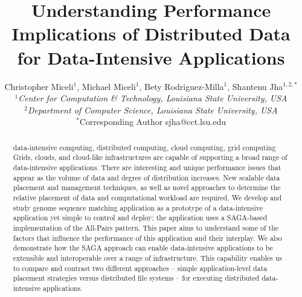\documentclass{rspublic}
\title[Understanding Performance Implications of Distributed Data for
Data-Intensive Applications]{Understanding Performance Implications of
Distributed Data for Data-Intensive Applications}
\author[Miceli, Miceli, Rodriguez-Milla, Jha]{ Christopher Miceli$^{1}$,
Michael Miceli$^{1}$, Bety Rodriguez-Milla$^{1}$, Shantenu Jha$^{1,2,*}$ \\
\small{\emph{$^{1}$Center for Computation \& Technology, Louisiana State
University, USA}} \\  \small{\emph{$^{2}$Department of Computer Science,
Louisiana State University, USA}} \\ {\footnotesize {\hspace{0.0 in}
$^*$Corresponding Author sjha@cct.lsu.edu}} }
\begin{document}
 \maketitle

\begin{abstract}{data-intensive computing, distributed computing,
cloud computing, grid computing} 
Grids, clouds, and cloud-like infrastructures are capable of
supporting a broad range of data-intensive applications. There are
interesting and unique performance issues that appear as the volume of
data and degree of distribution increases. New scalable data placement
and management techniques, as well as novel approaches to determine
the relative placement of data and computational workload are
required.  We develop and study genome sequence matching application
as a prototype of a data-intensive application yet simple to control
and deploy; the application uses a SAGA-based implementation of the
All-Pairs pattern.  This paper aims to understand some of the factors
that influence the performance of this application and their
interplay. We also demonstrate how the SAGA approach can enable
data-intensive applications to be extensible and interoperable over a
range of infrastructure. This capability enables us to compare and
contrast two different approaches -- simple application-level data
placement strategies versus distributed file systems -- for executing
distributed data-intensive applications.


\end{abstract}
\end{document}
